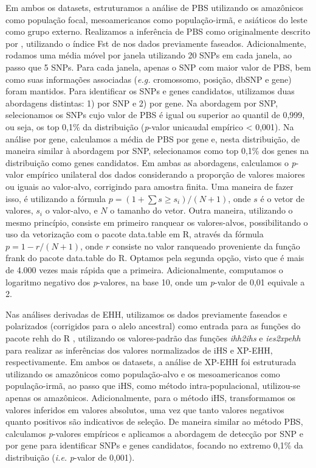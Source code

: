 Em ambos os datasets, estruturamos a análise de PBS utilizando os amazônicos como população focal, mesoamericanos como população-irmã, e asiáticos do leste como grupo externo. Realizamos a inferência de PBS como originalmente descrito por \cite{yi_sequencing_2010}, utilizando o índice Fst de \cite{reynolds_estimation_1983} nos dados previamente faseados. Adicionalmente, rodamos uma média móvel por janela utilizando 20 SNPs em cada janela, ao passo que 5 SNPs. Para cada janela, apenas o SNP com maior valor de PBS, bem como suas informações associadas (\emph{e.g.} cromossomo, posição, dbSNP e gene) foram mantidos. Para identificar os SNPs e genes candidatos, utilizamos duas abordagens distintas: 1) por SNP e 2) por gene. Na abordagem por SNP, selecionamos os SNPs cujo valor de PBS é igual ou superior ao quantil de 0,999, ou seja, os top 0,1\% da distribuição (\emph{p}-valor unicaudal empírico < 0,001). Na análise por gene, calculamos a média de PBS por gene e, nesta distribuição, de maneira similar à abordagem por SNP, selecionamos como top 0,1\% dos genes na distribuição como genes candidatos. Em ambas as abordagens, calculamos o \emph{p}-valor empírico unilateral dos dados considerando a proporção de valores maiores ou iguais ao valor-alvo, corrigindo para amostra finita. Uma maneira de fazer isso, é utilizando a fórmula $p = (1 + \sum s \geq s_i)/(N + 1)$, onde $s$ é o vetor de valores, $s_i$ o valor-alvo, e $N$ o tamanho do vetor. Outra maneira, utilizando o mesmo princípio, consiste em primeiro ranquear os valores-alvos, possibilitando o uso da vetorização com o pacote data.table em R, através da fórmula $p = 1 - r/(N+1)$, onde $r$ consiste no valor ranqueado proveniente da função frank do pacote data.table do R. Optamos pela segunda opção, visto que é mais de 4.000 vezes mais rápida que a primeira. Adicionalmente, computamos o logaritmo negativo dos \emph{p}-valores, na base 10, onde um \emph{p}-valor de 0,01 equivale a 2. 

Nas análises derivadas de EHH, utilizamos os dados previamente faseados e polarizados (corrigidos para o alelo ancestral) como entrada para as funções do pacote rehh do R \cite{gautier_rehh_2012,gautier_rehh_2017}, utilizando os valores-padrão das funções \emph{ihh2ihs} e \emph{ies2xpehh}  para realizar as inferências dos valores normalizados de iHS e XP-EHH, respectivamente. Em ambos os datasets, a análise de XP-EHH foi estruturada utilizando os amazônicos como população-alvo e os mesoamericanos como população-irmã, ao passo que iHS, como método intra-populacional, utilizou-se apenas os amazônicos. Adicionalmente, para o método iHS, transformamos os valores inferidos em valores absolutos, uma vez que tanto valores negativos quanto positivos são indicativos de seleção. De maneira similar ao método PBS, calculamos \emph{p}-valores empíricos e aplicamos a abordagem de detecção por SNP e por gene para identificar SNPs e genes candidatos, focando no extremo 0,1\% da distribuição (\emph{i.e.} \emph{p}-valor de 0,001). 

